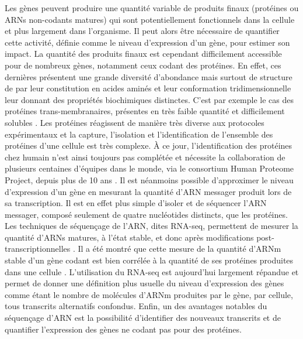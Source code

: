 Les gènes peuvent produire une quantité variable de produits finaux (protéines ou \acrshort{ARN}s non-codants matures) qui sont potentiellement fonctionnels dans la cellule et plus largement dans l’organisme. Il peut alors être nécessaire de quantifier cette activité, définie comme le niveau d'expression d’un gène, pour estimer son impact. La quantité des produits finaux est cependant difficilement accessible pour de nombreux gènes, notamment ceux codant des protéines. En effet, ces dernières présentent une grande diversité d’abondance mais surtout de structure de par leur constitution en acides aminés et leur conformation tridimensionnelle leur donnant des propriétés biochimiques distinctes. C’est par exemple le cas des protéines trans-membranaires, présentes en très faible quantité et difficilement solubles \citep{vuckovic_membrane_2013}. Les protéines réagissent de manière très diverse aux protocoles expérimentaux et la capture, l’isolation et l’identification de l’ensemble des protéines d’une cellule est très complexe. \`A ce jour, l’identification des protéines chez humain n’est ainsi toujours pas complétée et nécessite la collaboration de plusieurs centaines d'équipes dans le monde, via le consortium Human Proteome Project, depuis plus de 10 ans \citep{adhikari_high-stringency_2020}. Il est néanmoins possible d’approximer le niveau d’expression d’un gène en mesurant la quantité d’\acrshort{ARN} messager produit lors de sa transcription. Il est en effet plus simple d’isoler et de séquencer l’\acrshort{ARN} messager, composé seulement de quatre nucléotides distincts, que les protéines. Les techniques de séquençage de l’\acrshort{ARN}, dites \acrshort{RNA-seq}, permettent de mesurer la quantité d’\acrshort{ARN}s matures, à l’état stable, et donc après modifications post-transcriptionnelles \citep{chu_rna_2012}. Il a été montré que cette mesure de la quantité d’\acrshort{ARNm} stable d’un gène codant est bien corrélée à la quantité de ses protéines produites dans une cellule \citep{edfors_gene-specific_2016}. L’utilisation du \acrshort{RNA-seq} est aujourd’hui largement répandue et permet de donner une définition plus usuelle du niveau d’expression des gènes comme étant le nombre de molécules d’\acrshort{ARNm} produites par le gène, par cellule, tous transcrits alternatifs confondus. Enfin, un des avantages notables du séquençage d’\acrshort{ARN} est la possibilité d'identifier des nouveaux transcrits et de quantifier l’expression des gènes ne codant pas pour des protéines. \\

